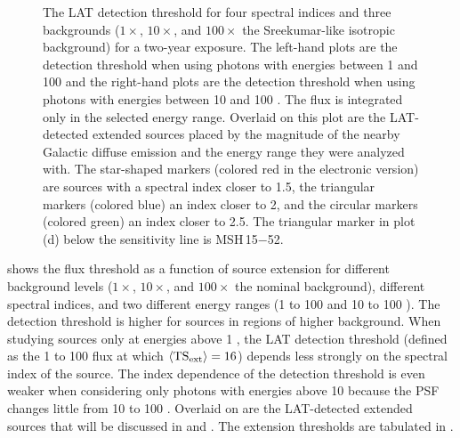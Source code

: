 \begin{figure}[htbp]
    \fi
    \caption{The LAT detection threshold for four spectral indices
    and three backgrounds ($1\times$, $10\times$, and $100\times$ the
    Sreekumar-like isotropic background) for a two-year exposure. The
    left-hand plots are the detection threshold when using 
    photons with energies between
    1 \gev and 100 \gev
    and the right-hand plots are the detection threshold when using
    photons with energies between
    10 \gev and 100 \gev.  The flux is integrated only in the
    selected energy range.  Overlaid on this plot are the LAT-detected
    extended sources placed by the magnitude of the nearby Galactic
    diffuse emission and the energy range they were analyzed with.
    The star-shaped markers (colored red in the electronic version)
    are sources with a spectral index closer to 1.5, the triangular
    markers (colored blue) an index closer to 2, and the circular markers
    (colored green) an index closer to 2.5.  The triangular marker in plot
    (d) below the sensitivity line is MSH\,15$-$52.
    } 
  \end{figure}


 shows the flux threshold as a function of
source extension for different background levels ($1\times$, $10\times$,
and $100\times$ the nominal background), different spectral indices,
and two different energy ranges (1 \gev to 100 \gev and 10 \gev to
100 \gev).  The detection threshold is higher for sources in regions of
higher background.  When studying sources only at energies above 1 \gev,
the LAT detection threshold (defined as the 1 \gev to 100 \gev flux at
which $\langle\mathrm{TS}_\mathrm{ext}\rangle=16$) depends less strongly on the 
spectral index of the source. 
The index dependence of the detection threshold is
even weaker when considering only photons with energies above 10 \gev
because the PSF changes little from 10 \gev to 100 \gev.
Overlaid on  are the LAT-detected extended
sources that will be discussed in  and
.  The extension thresholds are tabulated in
.


